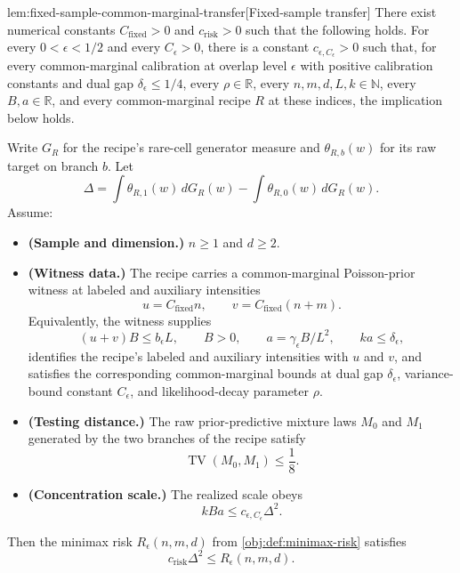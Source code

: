 \documentclass[11pt]{article}
\begin{document}
\begin{lemmav}{lem:fixed-sample-common-marginal-transfer}[Fixed-sample transfer]
There exist numerical constants \(C_{\mathrm{fixed}}>0\) and \(c_{\mathrm{risk}}>0\) such that the following holds.  For every \(0<\epsilon<1/2\) and every \(C_\epsilon>0\), there is a constant \(c_{\epsilon,C_\epsilon}>0\) such that, for every common-marginal calibration at overlap level \(\epsilon\) with positive calibration constants and dual gap \(\delta_\epsilon\le 1/4\), every \(\rho\in\mathbb R\), every \(n,m,d,L,k\in\mathbb N\), every \(B,a\in\mathbb R\), and every common-marginal recipe \(R\) at these indices, the implication below holds.

Write \(G_R\) for the recipe's rare-cell generator measure and \(\theta_{R,b}(w)\) for its raw target on branch \(b\).  Let
\[
\Delta
=
\int \theta_{R,1}(w)\,dG_R(w)
-
\int \theta_{R,0}(w)\,dG_R(w).
\]
Assume:
\begin{itemize}
\item \textbf{(Sample and dimension.)} \(n\ge 1\) and \(d\ge 2\).
\item \textbf{(Witness data.)} The recipe carries a common-marginal Poisson-prior witness at labeled and auxiliary intensities
\[
u=C_{\mathrm{fixed}}n,
\qquad
v=C_{\mathrm{fixed}}(n+m).
\]
Equivalently, the witness supplies
\[
(u+v)B\le b_\epsilon L,
\qquad
B>0,
\qquad
a=\gamma_\epsilon B/L^2,
\qquad
ka\le \delta_\epsilon,
\]
identifies the recipe's labeled and auxiliary intensities with \(u\) and \(v\), and satisfies the corresponding common-marginal bounds at dual gap \(\delta_\epsilon\), variance-bound constant \(C_\epsilon\), and likelihood-decay parameter \(\rho\).
\item \textbf{(Testing distance.)} The raw prior-predictive mixture laws \(M_0\) and \(M_1\) generated by the two branches of the recipe satisfy
\[
\operatorname{TV}(M_0,M_1)\le \frac18 .
\]
\item \textbf{(Concentration scale.)} The realized scale obeys
\[
kBa\le c_{\epsilon,C_\epsilon}\Delta^2 .
\]
\end{itemize}
Then the minimax risk \(R_\epsilon(n,m,d)\) from \cref{obj:def:minimax-risk} satisfies
\[
c_{\mathrm{risk}}\Delta^2
\le
R_\epsilon(n,m,d).
\]
\end{lemmav}
\end{document}
